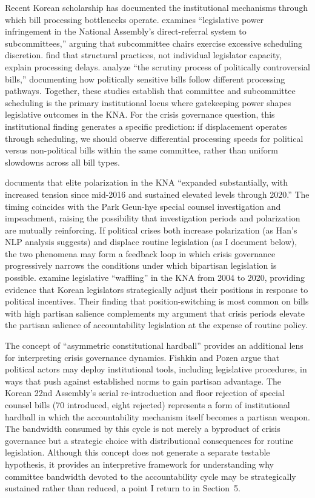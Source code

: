 \documentclass[11pt]{article}
\begin{document}
Recent Korean scholarship has documented the institutional mechanisms through which bill processing bottlenecks operate. \citet{parkpy2026} examines ``legislative power infringement in the National Assembly's direct-referral system to subcommittees,'' arguing that subcommittee chairs exercise excessive scheduling discretion. \citet{kimlee2026} find that structural practices, not individual legislator capacity, explain processing delays. \citet{seo2020} analyze ``the scrutiny process of politically controversial bills,'' documenting how politically sensitive bills follow different processing pathways. Together, these studies establish that committee and subcommittee scheduling is the primary institutional locus where gatekeeping power shapes legislative outcomes in the KNA. For the crisis governance question, this institutional finding generates a specific prediction: if displacement operates through scheduling, we should observe differential processing speeds for political versus non-political bills within the same committee, rather than uniform slowdowns across all bill types.

\citet{han2022} documents that elite polarization in the KNA ``expanded substantially, with increased tension since mid-2016 and sustained elevated levels through 2020.'' The timing coincides with the Park Geun-hye special counsel investigation and impeachment, raising the possibility that investigation periods and polarization are mutually reinforcing. If political crises both increase polarization (as Han's NLP analysis suggests) and displace routine legislation (as I document below), the two phenomena may form a feedback loop in which crisis governance progressively narrows the conditions under which bipartisan legislation is possible. \citet{kang2025} examine legislative ``waffling'' in the KNA from 2004 to 2020, providing evidence that Korean legislators strategically adjust their positions in response to political incentives. Their finding that position-switching is most common on bills with high partisan salience complements my argument that crisis periods elevate the partisan salience of accountability legislation at the expense of routine policy.

The concept of ``asymmetric constitutional hardball'' \citep{fishkin2018} provides an additional lens for interpreting crisis governance dynamics. Fishkin and Pozen argue that political actors may deploy institutional tools, including legislative procedures, in ways that push against established norms to gain partisan advantage. The Korean 22nd Assembly's serial re-introduction and floor rejection of special counsel bills (70 introduced, eight rejected) represents a form of institutional hardball in which the accountability mechanism itself becomes a partisan weapon. The bandwidth consumed by this cycle is not merely a byproduct of crisis governance but a strategic choice with distributional consequences for routine legislation. Although this concept does not generate a separate testable hypothesis, it provides an interpretive framework for understanding why committee bandwidth devoted to the accountability cycle may be strategically sustained rather than reduced, a point I return to in Section~5.
\end{document}
